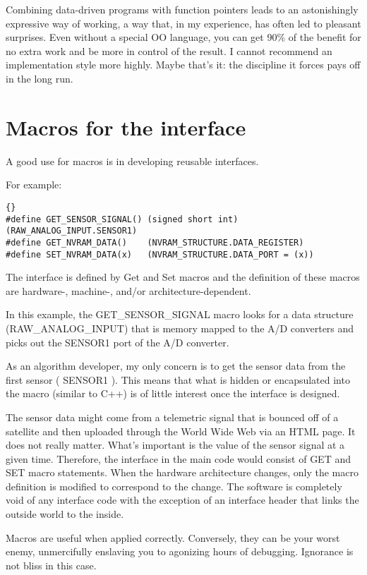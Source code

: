 \documentclass{report}
\begin{document}
Combining data-driven programs with function pointers leads to an astonishingly expressive way of working, a way that, in my experience, has often led to pleasant surprises. Even without a special OO language, you can get 90\% of the benefit for no extra work and be more in control of the result. I cannot recommend an implementation style more highly.
Maybe that's it: the discipline it forces pays off in the long run. 




\section{Macros for the interface}
A good use for macros is in developing reusable interfaces.

For example: 
\begin{lstlisting}{}
#define GET_SENSOR_SIGNAL() (signed short int)(RAW_ANALOG_INPUT.SENSOR1)
#define GET_NVRAM_DATA()    (NVRAM_STRUCTURE.DATA_REGISTER)
#define SET_NVRAM_DATA(x)   (NVRAM_STRUCTURE.DATA_PORT = (x))
\end{lstlisting}
The interface is defined by Get and Set macros and the definition of these macros are hardware-, machine-, and/or architecture-dependent.

In this example, the GET\_SENSOR\_SIGNAL macro looks for a data structure (RAW\_ANALOG\_INPUT) that is memory mapped to the A/D converters and picks out the SENSOR1 port of the A/D converter.

As an algorithm developer, my only concern is to get the sensor data from the first sensor ( SENSOR1 ). This means that what is hidden or encapsulated into the macro (similar to C++) is of little interest once the interface is designed.

The sensor data might come from a telemetric signal that is bounced off of a satellite and then uploaded through the World Wide Web via an HTML page. It does not really matter. What's important is the value of the sensor signal at a given time. Therefore, the interface in the main code would consist of GET and SET macro statements. When the hardware architecture changes, only the macro definition is modified to correspond to the change. The software is completely void of any interface code with the exception of an interface header that links the outside world to the inside.

Macros are useful when applied correctly. Conversely, they can be your worst enemy, unmercifully enslaving you to agonizing hours of debugging. Ignorance is not bliss in this case. 
\end{document}
